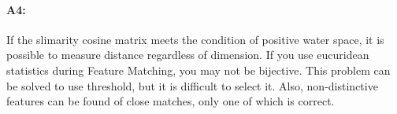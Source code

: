 \paragraph{A4:} If the slimarity cosine matrix meets the condition of positive water space, it is possible to measure distance regardless of dimension.
If you use eucuridean statistics during Feature Matching, you may not be bijective. This problem can be solved to use threshold, but it is difficult to select it. Also, non-distinctive features can be found of close matches, only one of which is correct.








